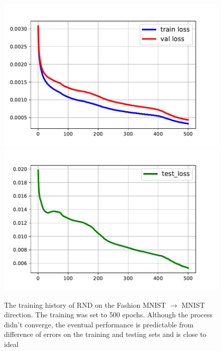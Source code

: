 \documentclass{article}
\begin{document}
\begin{figure}[h]
        \includegraphics[scale=0.45]{learning_curves_train_fashion_to_original.pdf}
        \includegraphics[scale=0.45]{learning_curves_test_fashion_to_original.pdf}
    \caption{The training history of RND on the Fashion MNIST $\rightarrow$ MNIST direction. The training was set to 500 epochs. Although the process didn't converge, the eventual performance is predictable from difference of errors on the training and testing sets and is close to ideal}
    \label{fig:learning_on_fashion}
\end{figure}
\end{document}
